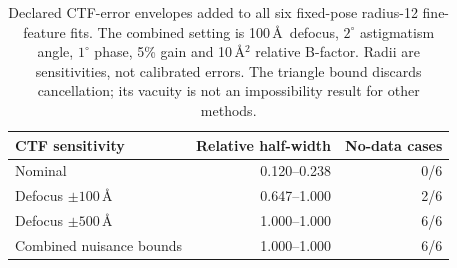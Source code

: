 \begin{table}[t]
\centering\small
\begin{tabular}{lrr}
\toprule
CTF sensitivity & Relative half-width & No-data cases\\
\midrule
Nominal & 0.120--0.238 & 0/6\\
Defocus $\pm100$\,\AA & 0.647--1.000 & 2/6\\
Defocus $\pm500$\,\AA & 1.000--1.000 & 6/6\\
Combined nuisance bounds & 1.000--1.000 & 6/6\\
\bottomrule
\end{tabular}
\caption{Declared CTF-error envelopes added to all six fixed-pose radius-12 fine-feature fits. The combined setting is 100\,\AA\ defocus, $2^\circ$ astigmatism angle, $1^\circ$ phase, 5\% gain and 10\,\AA$^2$ relative B-factor. Radii are sensitivities, not calibrated errors. The triangle bound discards cancellation; its vacuity is not an impossibility result for other methods.}
\label{tab:revisionctf}
\end{table}
